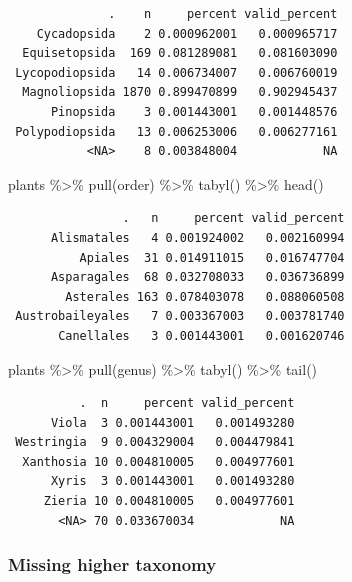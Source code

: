 \documentclass[
  letterpaper,
  DIV=11,
  numbers=noendperiod,
  oneside]{scrreprt}
\newenvironment{Shaded}{\begin{snugshade}}{\end{snugshade}}
\newcommand{\FunctionTok}[1]{\textcolor[rgb]{0.28,0.35,0.67}{#1}}
\newcommand{\NormalTok}[1]{\textcolor[rgb]{0.00,0.23,0.31}{#1}}
\newcommand{\SpecialCharTok}[1]{\textcolor[rgb]{0.37,0.37,0.37}{#1}}
\begin{document}
\begin{verbatim}
              .    n     percent valid_percent
    Cycadopsida    2 0.000962001   0.000965717
  Equisetopsida  169 0.081289081   0.081603090
 Lycopodiopsida   14 0.006734007   0.006760019
  Magnoliopsida 1870 0.899470899   0.902945437
      Pinopsida    3 0.001443001   0.001448576
 Polypodiopsida   13 0.006253006   0.006277161
           <NA>    8 0.003848004            NA
\end{verbatim}

\begin{Shaded}
\begin{Highlighting}[]
\NormalTok{plants }\SpecialCharTok{\%\textgreater{}\%} 
  \FunctionTok{pull}\NormalTok{(order) }\SpecialCharTok{\%\textgreater{}\%} 
  \FunctionTok{tabyl}\NormalTok{() }\SpecialCharTok{\%\textgreater{}\%} 
  \FunctionTok{head}\NormalTok{()}
\end{Highlighting}
\end{Shaded}

\begin{verbatim}
                .   n     percent valid_percent
      Alismatales   4 0.001924002   0.002160994
          Apiales  31 0.014911015   0.016747704
      Asparagales  68 0.032708033   0.036736899
        Asterales 163 0.078403078   0.088060508
 Austrobaileyales   7 0.003367003   0.003781740
       Canellales   3 0.001443001   0.001620746
\end{verbatim}

\begin{Shaded}
\begin{Highlighting}[]
\NormalTok{plants }\SpecialCharTok{\%\textgreater{}\%} 
  \FunctionTok{pull}\NormalTok{(genus) }\SpecialCharTok{\%\textgreater{}\%} 
  \FunctionTok{tabyl}\NormalTok{() }\SpecialCharTok{\%\textgreater{}\%} 
  \FunctionTok{tail}\NormalTok{()}
\end{Highlighting}
\end{Shaded}

\begin{verbatim}
          .  n     percent valid_percent
      Viola  3 0.001443001   0.001493280
 Westringia  9 0.004329004   0.004479841
  Xanthosia 10 0.004810005   0.004977601
      Xyris  3 0.001443001   0.001493280
     Zieria 10 0.004810005   0.004977601
       <NA> 70 0.033670034            NA
\end{verbatim}

\hypertarget{missing-higher-taxonomy}{%
\subsubsection*{Missing higher taxonomy}\label{missing-higher-taxonomy}}
\end{document}
